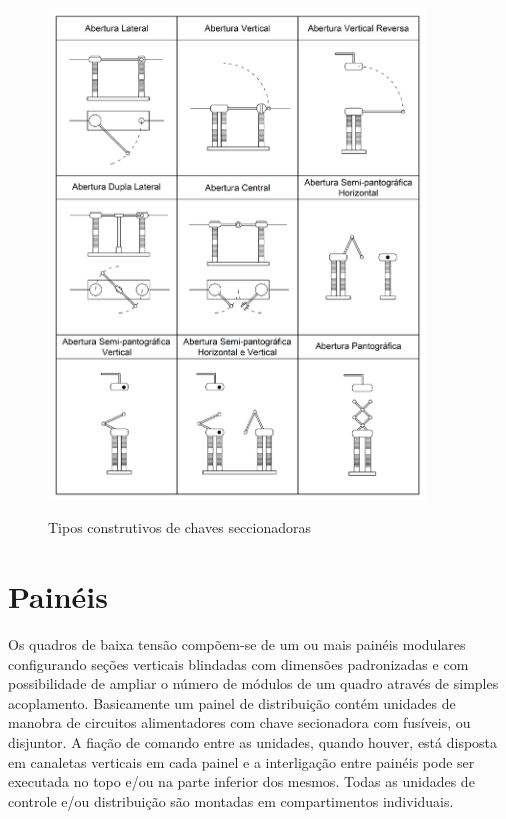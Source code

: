 \documentclass[a5paper,english,spanish,brazil]{ufsc-thesis}
\begin{document}
\begin{figure}[htb]
  \caption{Tipos construtivos de chaves seccionadoras}
  \centering
  \includegraphics[width=10cm]{chavesec.pdf}
  \label{fig:chavesec}
\end{figure}

\section{Painéis}
Os quadros de baixa tensão compõem-se de um ou mais painéis modulares configurando seções verticais blindadas com dimensões padronizadas e com possibilidade de ampliar o número de módulos de um quadro através de simples acoplamento. Basicamente um painel de distribuição contém unidades de manobra de circuitos alimentadores com chave secionadora com fusíveis, ou disjuntor. A fiação de comando entre as unidades, quando houver, está disposta em canaletas verticais em cada painel e a interligação entre painéis pode ser executada no topo e/ou na parte inferior dos mesmos. Todas as unidades de controle e/ou distribuição são montadas em compartimentos individuais.
\end{document}
